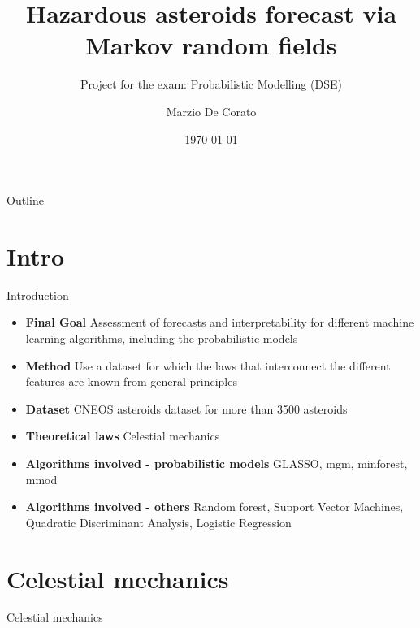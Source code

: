 \documentclass{beamer}
\title[Probabilistic modeling project]{Hazardous asteroids forecast via Markov random fields}
\subtitle{Project for the exam: Probabilistic Modelling (DSE)}
\author{Marzio De Corato}
\date{\today}
\begin{document}
\begin{frame}
\vspace{+4.2 cm}  \titlepage
\end{frame}

\usebackgroundtemplate{ } 

\begin{frame}{Outline}
\setcounter{tocdepth}{1}
\begin{center}
  \tableofcontents
\end{center}
\end{frame}

\section{Intro}

\begin{frame}{Introduction}

\begin{itemize}
\item \textbf{Final Goal} Assessment of forecasts and interpretability for different machine learning algorithms, including the probabilistic models
\item \textbf{Method} Use a dataset for which the laws that interconnect the different features are known from general principles
\item \textbf{Dataset} CNEOS asteroids dataset for more than 3500 asteroids
\item \textbf{Theoretical laws} Celestial mechanics
\item \textbf{Algorithms involved - probabilistic models} GLASSO, mgm, minforest, mmod
\item \textbf{Algorithms involved - others} Random forest, Support Vector Machines, Quadratic Discriminant Analysis, Logistic Regression  

\end{itemize} 

\end{frame}

\section{Celestial mechanics}

\begin{frame}{}
\begin{center}
{\Huge Celestial mechanics}
\end{center}
\end{frame}
\end{document}
